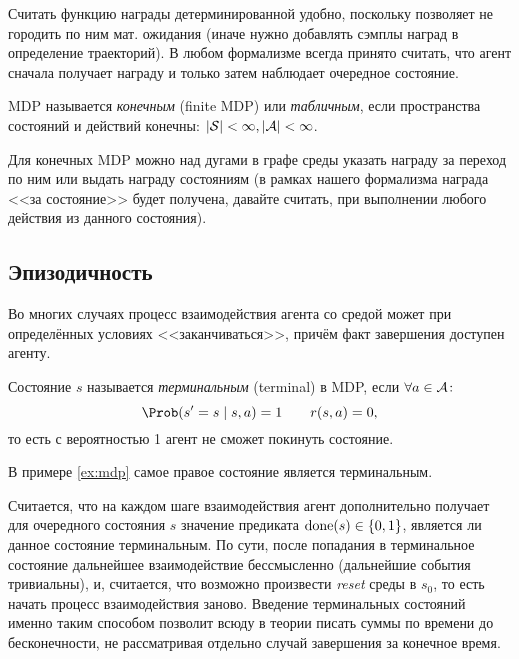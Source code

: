 Считать функцию награды детерминированной удобно, поскольку позволяет не городить по ним мат. ожидания (иначе нужно добавлять сэмплы наград в определение траекторий). В любом формализме всегда принято считать, что агент сначала получает награду и только затем наблюдает очередное состояние. 

\begin{definition}
MDP называется \emph{конечным} (finite MDP) или \emph{табличным}, если пространства состояний и действий конечны: $|\mathcal{S}| < \infty, |\mathcal{A}| < \infty$.
\end{definition}

\begin{exampleBox}[label=ex:mdp]{}
Для конечных MDP можно над дугами в графе среды указать награду за переход по ним или выдать награду состояниям (в рамках нашего формализма награда <<за состояние>> будет получена, давайте считать, при выполнении любого действия из данного состояния).
\begin{center}
\end{center}
\end{exampleBox}

\subsection{Эпизодичность}

Во многих случаях процесс взаимодействия агента со средой может при определённых условиях <<заканчиваться>>, причём факт завершения доступен агенту.

\begin{definition}
Состояние $s$ называется \emph{терминальным} (terminal) в MDP, если $\forall a \in \mathcal{A} \colon$
$$\Prob (s' = s \mid s, a) = 1 \qquad r(s, a) = 0,$$
то есть с вероятностью 1 агент не сможет покинуть состояние.
\end{definition}

\begin{example}
В примере \ref{ex:mdp} самое правое состояние является терминальным.
\end{example}

Считается, что на каждом шаге взаимодействия агент дополнительно получает для очередного состояния $s$ значение предиката $\done(s) \HM\in \{0, 1\}$, является ли данное состояние терминальным. По сути, после попадания в терминальное состояние дальнейшее взаимодействие бессмысленно (дальнейшие события тривиальны), и, считается, что возможно произвести \emph{reset} среды в $s_0$, то есть начать процесс взаимодействия заново. Введение терминальных состояний именно таким способом позволит всюду в теории писать суммы по времени до бесконечности, не рассматривая отдельно случай завершения за конечное время.

